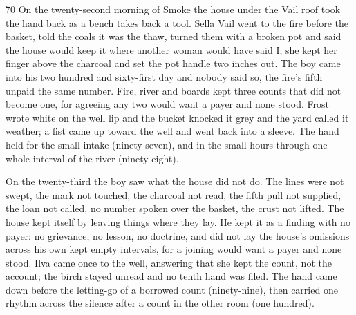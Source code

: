 
\scenebreak


\scenebreak


\scenebreak

\CRtailpiece
\begin{CRchronicle}{70}
On the twenty-second morning of Smoke the house under the Vail roof took the hand back as a bench takes back a tool. Sella Vail went to the fire before the basket, told the coals it was the thaw, turned them with a broken pot and said the house would keep it where another woman would have said I; she kept her finger above the charcoal and set the pot handle two inches out. The boy came into his two hundred and sixty-first day and nobody said so, the fire’s fifth unpaid the same number. Fire, river and boards kept three counts that did not become one, for agreeing any two would want a payer and none stood. Frost wrote white on the well lip and the bucket knocked it grey and the yard called it weather; a fist came up toward the well and went back into a sleeve. The hand held for the small intake (ninety-seven), and in the small hours through one whole interval of the river (ninety-eight).

On the twenty-third the boy saw what the house did not do. The lines were not swept, the mark not touched, the charcoal not read, the fifth pull not supplied, the loan not called, no number spoken over the basket, the crust not lifted. The house kept itself by leaving things where they lay. He kept it as a finding with no payer: no grievance, no lesson, no doctrine, and did not lay the house’s omissions across his own kept empty intervals, for a joining would want a payer and none stood. Ilva came once to the well, answering that she kept the count, not the account; the birch stayed unread and no tenth hand was filed. The hand came down before the letting-go of a borrowed count (ninety-nine), then carried one rhythm across the silence after a count in the other room (one hundred).


\end{CRchronicle}
